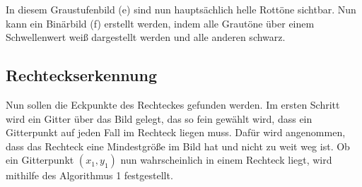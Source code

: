 In diesem Graustufenbild (e) sind nun hauptsächlich helle Rottöne sichtbar. Nun kann ein Binärbild (f) erstellt werden, indem alle Grautöne über einem Schwellenwert weiß dargestellt werden und alle anderen schwarz. 


\subsection{Rechteckserkennung}

Nun sollen die Eckpunkte des Rechteckes gefunden werden. Im ersten Schritt wird ein Gitter über das Bild gelegt, das so fein gewählt wird, dass ein Gitterpunkt auf jeden Fall im Rechteck liegen muss. Dafür wird angenommen, dass das Rechteck eine Mindestgröße im Bild hat und nicht zu weit weg ist. Ob ein Gitterpunkt $(x_1,y_1)$ nun wahrscheinlich in einem Rechteck liegt, wird mithilfe des Algorithmus 1 festgestellt.\\


